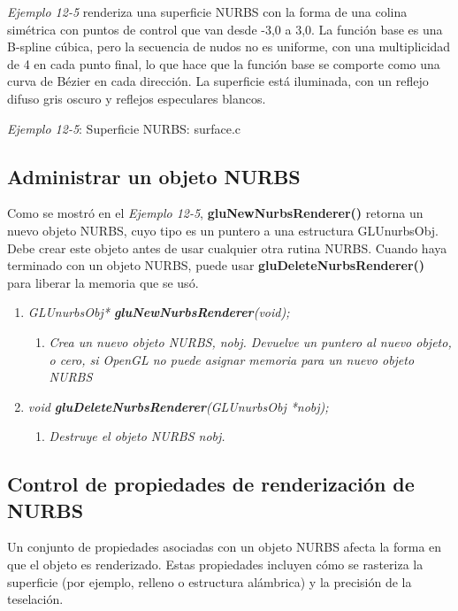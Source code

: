\emph{Ejemplo 12-5} renderiza una superficie NURBS con la
forma de una colina simétrica con puntos de control que
van desde -3,0 a 3,0. La función base es una B-spline
cúbica, pero la secuencia de nudos no es uniforme,
con una multiplicidad de 4 en cada punto final, lo que
hace que la función base se comporte como una curva de
Bézier en cada dirección. La superficie está iluminada,
con un reflejo difuso gris oscuro y reflejos especulares blancos.

\emph{Ejemplo 12-5}: Superficie NURBS: surface.c



\subsection{Administrar un objeto NURBS}

Como se mostró en el \emph{Ejemplo 12-5}, \textbf{gluNewNurbsRenderer()}
retorna un nuevo objeto NURBS, cuyo tipo es un puntero a una
estructura GLUnurbsObj. Debe crear este objeto antes de usar cualquier
otra rutina NURBS. Cuando haya terminado con un objeto NURBS, puede
usar \textbf{gluDeleteNurbsRenderer()} para liberar la memoria que se usó.

\begin{enumerate}
    \item[] \emph{GLUnurbsObj* \textbf{gluNewNurbsRenderer}(void);}
    \begin{enumerate}
        \item[] \textit{Crea un nuevo objeto NURBS, nobj.
        Devuelve un puntero al nuevo objeto, o cero, si OpenGL no
        puede asignar memoria para un nuevo objeto NURBS}
    \end{enumerate}
    \item[] \emph{void \textbf{gluDeleteNurbsRenderer}(GLUnurbsObj *nobj);}
    \begin{enumerate}
        \item[] \textit{Destruye el objeto NURBS nobj.}
    \end{enumerate}
\end{enumerate}

\subsection{Control de propiedades de renderización de NURBS}

Un conjunto de propiedades asociadas con un objeto NURBS afecta la
forma en que el objeto es renderizado. Estas propiedades incluyen
cómo se rasteriza la superficie (por ejemplo, relleno o estructura alámbrica)
y la precisión de la teselación.

